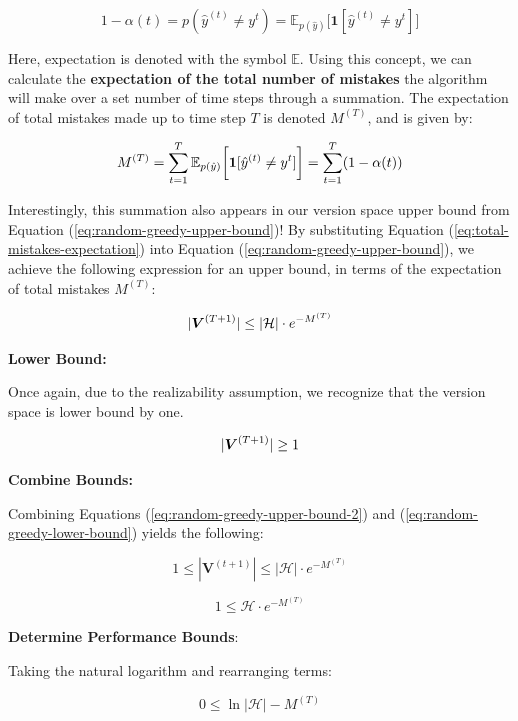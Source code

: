 \documentclass[11pt]{article}
\begin{document}
$$1 - \alpha(t) = p(\hat{y}^{(t)} \neq y^t) = \mathbb{E}_{p(\hat{y})} \bigg[ \textbf{1} [\hat{y}^{(t)} \neq y^t] \bigg] $$

Here, expectation is denoted with the symbol $\mathbb{E}$. Using this concept, we can calculate the \textbf{expectation of the total number of mistakes} the algorithm will make over a set number of time steps through a summation. The expectation of total mistakes made up to time step $T$ is denoted $M^{(T)}$, and is given by:

\begin{equation}
\centering    
M^{(T)} =  \sum_{t=1}^T\mathbb{E}_{p(\hat{y})} \bigg[ \textbf{1}  [\hat{y}^{(t)} \neq y^t] \bigg] = \sum_{t=1}^T (1 - \alpha(t)) \label{eq:total-mistakes-expectation}
\end{equation}

Interestingly, this summation also appears in our version space upper bound from Equation (\ref{eq:random-greedy-upper-bound})! By substituting Equation (\ref{eq:total-mistakes-expectation}) into Equation (\ref{eq:random-greedy-upper-bound}), we achieve the following expression for an upper bound, in terms of the expectation of total mistakes $M^{(T)}$:

\begin{equation}
\centering
|\boldsymbol{V}^{(T+1)}| \leq |\mathcal{H}| \cdot e^{- M^{(T)}}
\label{eq:random-greedy-upper-bound-2}
\end{equation}

\textbf{Lower Bound:} 

Once again, due to the realizability assumption, we recognize that the version space is lower bound by one.

\begin{equation}
\centering
|\boldsymbol{V}^{(T+1)}| \ge 1
\label{eq:random-greedy-lower-bound}
\end{equation}

\textbf{Combine Bounds:}

Combining Equations (\ref{eq:random-greedy-upper-bound-2}) and (\ref{eq:random-greedy-lower-bound}) yields the following:

$$1 \leq |\boldsymbol{V}^{(t+1)}| \leq |\mathcal{H}| \cdot e^{-M^{(T)}}$$

$$1 \leq \mathcal{H} \cdot e^{-M^{(T)}}$$

\textbf{Determine Performance Bounds}:

Taking the natural logarithm and rearranging terms:

$$0 \leq \ln{|\mathcal{H}|} - M^{(T)}$$
\end{document}
